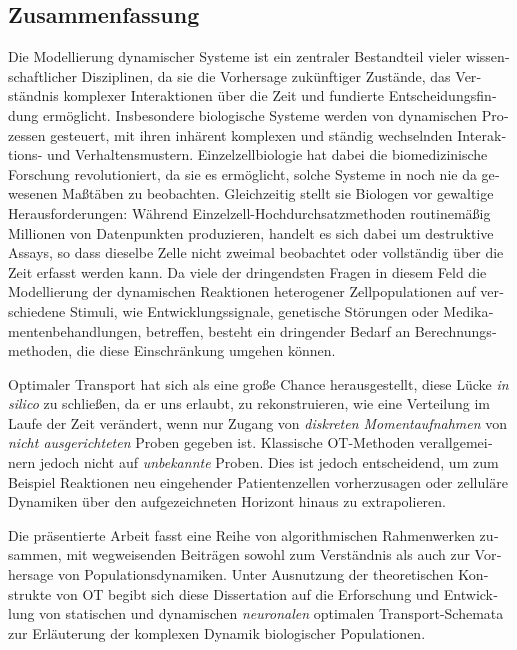 \begingroup
\let\clearpage\relax
\let\cleardoublepage\relax
\let\cleardoublepage\relax

\begin{otherlanguage}{ngerman}
\chapter*{Zusammenfassung}

Die Modellierung dynamischer Systeme ist ein zentraler Bestandteil vieler wissenschaftlicher Disziplinen, da sie die Vorhersage zuk{\"u}nftiger Zust{\"a}nde, das Verst{\"a}ndnis komplexer Interaktionen {\"u}ber die Zeit und fundierte Entscheidungsfindung erm{\"o}glicht. Insbesondere biologische Systeme werden von dynamischen Prozessen gesteuert, mit ihren inh{\"a}rent komplexen und st{\"a}ndig wechselnden Interaktions- und Verhaltensmustern. Einzelzellbiologie hat dabei die biomedizinische Forschung revolutioniert, da sie es erm{\"o}glicht, solche Systeme in noch nie da gewesenen Ma{\ss}t{\"a}ben zu beobachten. Gleichzeitig stellt sie Biologen vor gewaltige Herausforderungen: W{\"a}hrend Einzelzell-Hochdurchsatzmethoden routinem{\"a}{\ss}ig Millionen von Datenpunkten produzieren, handelt es sich dabei um destruktive Assays, so dass dieselbe Zelle nicht zweimal beobachtet oder vollst{\"a}ndig {\"u}ber die Zeit erfasst werden kann. Da viele der dringendsten Fragen in diesem Feld die Modellierung der dynamischen Reaktionen heterogener Zellpopulationen auf verschiedene Stimuli, wie Entwicklungssignale, genetische St{\"o}rungen oder Medikamentenbehandlungen, betreffen, besteht ein dringender Bedarf an Berechnungsmethoden, die diese Einschr{\"a}nkung umgehen k{\"o}nnen.

Optimaler Transport hat sich als eine gro{\ss}e Chance herausgestellt, diese L{\"u}cke \textit{in silico} zu schlie{\ss}en, da er uns erlaubt, zu rekonstruieren, wie eine Verteilung im Laufe der Zeit ver{\"a}ndert, wenn nur Zugang von \emph{diskreten Momentaufnahmen} von \emph{nicht ausgerichteten} Proben gegeben ist. Klassische OT-Methoden verallgemeinern jedoch nicht auf \emph{unbekannte} Proben. Dies ist jedoch entscheidend, um zum Beispiel Reaktionen neu eingehender Patientenzellen vorherzusagen oder zellul{\"a}re Dynamiken {\"u}ber den aufgezeichneten Horizont hinaus zu extrapolieren.

Die pr{\"a}sentierte Arbeit fasst eine Reihe von algorithmischen Rahmenwerken zusammen, mit wegweisenden Beitr{\"a}gen sowohl zum Verst{\"a}ndnis als auch zur Vorhersage von Populationsdynamiken. Unter Ausnutzung der theoretischen Konstrukte von OT begibt sich diese Dissertation auf die Erforschung und Entwicklung von statischen und dynamischen \emph{neuronalen} optimalen Transport-Schemata zur Erl{\"a}uterung der komplexen Dynamik biologischer Populationen.


\end{otherlanguage}

